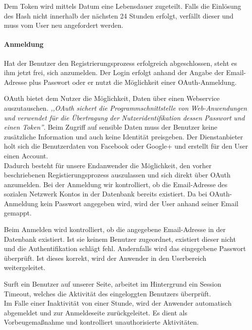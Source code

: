 Dem Token wird mittels Datum eine Lebensdauer zugeteilt. Falls die Einlösung des Hash nicht innerhalb der nächsten 24 Stunden erfolgt, verfällt dieser und muss vom User neu angefordert werden. 

\paragraph{Anmeldung}
Hat der Benutzer den Registrierungsprozess erfolgreich abgeschlossen, steht es ihm jetzt frei, sich anzumelden. Der Login erfolgt anhand der Angabe der Email-Adresse plus Passwort oder er nutzt die Möglichkeit einer \gls{OAuth}-Anmeldung.

OAuth bietet dem Nutzer die Möglichkeit, Daten über einen Webservice auszutauschen. \textit{,,OAuth sichert die Programmschnittstelle von Web-Anwendungen und verwendet für die Übertragung der Nutzeridentifikation dessen Passwort und einen Token''}\cite{OAUTH}. Beim Zugriff auf sensible Daten muss der Benutzer keine zusätzliche Information und auch keine Identität preisgeben. Der Dienstanbieter holt sich die Benutzerdaten von Facebook oder Google+ und erstellt für den User einen Account.\\
Dadurch besteht für unsere Endanwender die Möglichkeit, den vorher beschriebenen Registierungsprozess auszulassen und sich direkt über OAuth anzumelden. Bei der Anmeldung wir kontrolliert, ob die Email-Adresse des sozialen Netzwerk Kontos in der Datenbank bereits existiert. Da bei OAuth-Anmeldung kein Passwort angegeben wird, wird der User anhand seiner Email gemappt.


Beim Anmelden wird kontrolliert, ob die angegebene Email-Adresse in der Datenbank existiert. Ist sie keinem Benutzer zugeordnet, existiert dieser nicht und die Authentifikation schlägt fehl. Andernfalls wird das eingegebene Passwort überprüft. Ist dieses korrekt, wird der Anwender in den Userbereich weitergeleitet.

Surft ein Benutzer auf unserer Seite, arbeitet im Hintergrund ein Session Timeout, welches die Aktivität des eingeloggten Benutzers überprüft.\\
Im Falle einer Inaktivität von einer Stunde, wird der Anwender automatisch abgemeldet und zur Anmeldeseite zurückgeleitet. Es dient als Vorbeugemaßnahme und kontrolliert unauthorisierte Aktivitäten.

\newpage

